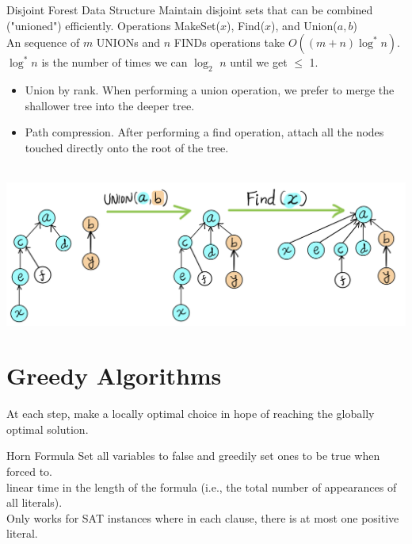 \documentclass[10pt,a4paper]{article}
\begin{document}
\begin{multicols}{3}
\begin{textbox}{Disjoint Forest Data Structure} 
    Maintain disjoint sets that can be combined ("unioned") efficiently. Operations MakeSet($x$), Find($x$), and Union($a, b$)\\
    \linebreak
     An sequence of $m$ UNIONs and $n$ FINDs operations take $O((m + n) \log^* n)$.\\
     $\log^* n$ is the number of times we can $\log_2$ $n$ until we get $\leq$ 1.\\
    \begin{itemize}
        \item Union by rank. When performing a union operation, we prefer to merge the shallower tree into the deeper tree.
        \item Path compression. After performing a find operation, attach all the nodes touched directly onto the root of the tree.
    \end{itemize}
    \\
    \includegraphics[width=\textwidth]{images/Union-Find.jpeg}
\end{textbox}

\section{Greedy Algorithms}

\begin{textbox}{}
     At each step, make a locally optimal choice in hope of reaching the globally optimal solution. \\
\end{textbox}
\begin{textbox}{Horn Formula}
     Set all variables to false and greedily set ones to be true when forced to.\\
    \linebreak
     linear time in the length of the formula (i.e., the total number of appearances of all literals). \\
    \linebreak
     Only works for SAT instances where in each clause, there is at most one positive literal.
\end{textbox}


\end{multicols}
\end{document}
